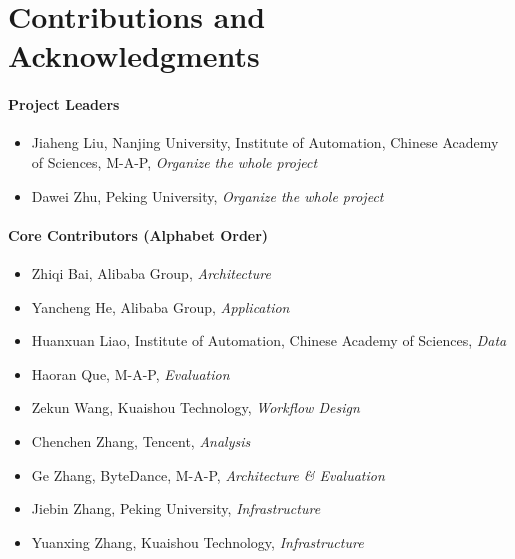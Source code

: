 \documentclass[11pt, a4paper, logo, copyright, nonumbering]{map}
\begin{document}
\clearpage
\newpage


\section{Contributions and Acknowledgments}
\paragraph{Project Leaders}
\begin{itemize}
    
    \item Jiaheng Liu, Nanjing University, Institute of Automation, Chinese Academy of Sciences, M-A-P, \textit{Organize the whole project}
    \item Dawei Zhu, Peking University, \textit{Organize the whole project}
\end{itemize}


\paragraph{Core Contributors (Alphabet Order)}
\begin{itemize}
   
\item Zhiqi Bai, Alibaba Group, \textit{Architecture}
\item Yancheng He,  Alibaba Group, \textit{Application}
\item Huanxuan Liao, Institute of Automation, Chinese Academy of Sciences, \textit{Data}
\item Haoran Que, M-A-P, \textit{Evaluation}
\item Zekun Wang, Kuaishou Technology, \textit{Workflow Design}
\item Chenchen Zhang, Tencent, \textit{Analysis}
\item Ge Zhang, ByteDance, M-A-P, \textit{Architecture \& Evaluation}
\item Jiebin Zhang, Peking University, \textit{Infrastructure}
\item Yuanxing Zhang, Kuaishou Technology, \textit{Infrastructure}
\end{itemize}
\end{document}
